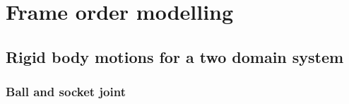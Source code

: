 


\section{Frame order modelling}
\label{sect: Frame order modelling}





\subsection{Rigid body motions for a two domain system}





\subsubsection{Ball and socket joint}

